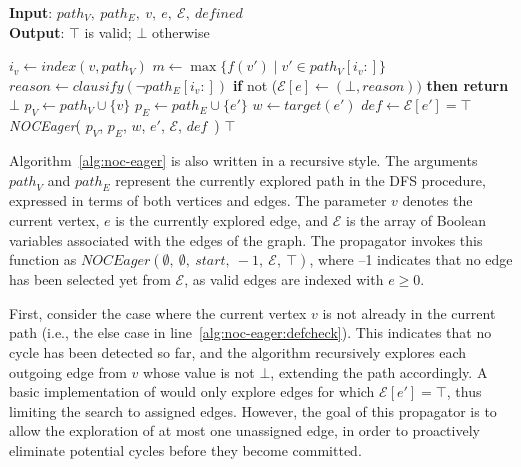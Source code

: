 \documentclass[runningheads]{llncs}
\begin{document}
\begin{algorithm}[htb]
\small
\caption{\textbf{\textit{NOCEager}}}
\textbf{Input}: $path_V,\ path_E,\ v,\ e,\ \mathcal{E},\ \textit{defined}$ \\
\textbf{Output}: $\top$ is valid; $\bot$ otherwise
\begin{algorithmic}[1]
     \label{alg:noc-eager:pathcheck}
        \STATE $i_v \gets \textit{index}(v, path_V)$
        \STATE $m \gets \max\{f(v') \mid v' \in path_V[i_v:]\}$
         \label{alg:noc-eager:checkopponent}
            \STATE $\textit{reason} \gets \textit{clausify}(\neg path_E[i_v:])$ \label{alg:noc-eager:reason}
            \STATE \textbf{if }not ($\mathcal{E}[e] \gets (\bot, \textit{reason}))$ \textbf{then return $\bot$}
        \ENDIF
     \label{alg:noc-eager:defcheck}
         \label{alg:no-opponent-cycle-f1:edgecheck}
            \STATE $p_V \gets path_V \cup \{v\}$
            \STATE $p_E \gets path_E \cup \{e'\}$
            \STATE $w \gets \textit{target}(e')$
            \STATE $\textit{def} \gets \mathcal{E}[e'] = \top$
            \STATE \textit{NOCEager}(
                $p_V$,
                $p_E$,
                $w$,
                $e'$,
                $\mathcal{E}$,
                $\textit{def}$\ )
        \ENDFOR
    \ENDIF
    \RETURN $\top$
\end{algorithmic}
\label{alg:noc-eager}
\end{algorithm}

Algorithm~\ref{alg:noc-eager} is also written in a recursive style. The arguments $\mathit{path}_V$ and $\mathit{path}_E$ represent the currently explored path in the DFS procedure, expressed in terms of both vertices and edges. The parameter $v$ denotes the current vertex, $e$ is the currently explored edge, and $\mathcal{E}$ is the array of Boolean variables associated with the edges of the graph. The \noc propagator invokes this function as $\textit{NOCEager}(\emptyset,\ \emptyset,\ start,\ -1,\ \mathcal{E},\ \top)$, where –1 indicates that no edge has been selected yet from $\mathcal{E}$, as valid edges are indexed with $e \geq 0$.

First, consider the case where the current vertex $v$ is not already in the current path (i.e., the else case in line~\ref{alg:noc-eager:defcheck}). This indicates that no cycle has been detected so far, and the algorithm recursively explores each outgoing edge from $v$ whose value is not $\bot$, extending the path accordingly. A basic implementation of \noceager would only explore edges for which $\mathcal{E}[e'] = \top$, thus limiting the search to assigned edges. However, the goal of this propagator is to allow the exploration of at most one unassigned edge, in order to proactively eliminate potential cycles before they become committed.
\end{document}
